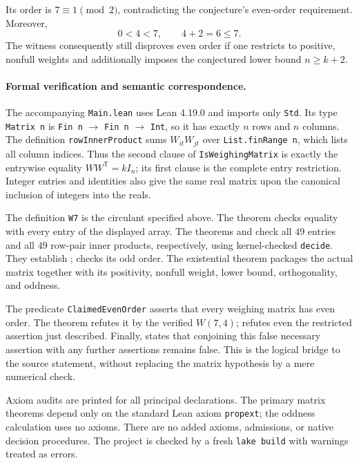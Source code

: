 \documentclass[10pt]{article}
\begin{document}
Its order is $7\equiv1\pmod2$, contradicting the conjecture's even-order requirement. Moreover,
\[
0<4<7,\qquad 4+2=6\le7.
\]
The witness consequently still disproves even order if one restricts to positive, nonfull weights and additionally imposes the conjectured lower bound $n\ge k+2$.

\newpage
\paragraph{Formal verification and semantic correspondence.}
The accompanying \texttt{Main.lean} uses Lean 4.19.0 and imports only \texttt{Std}. Its type \texttt{Matrix n} is \texttt{Fin n} $\to$ \texttt{Fin n} $\to$ \texttt{Int}, so it has exactly $n$ rows and $n$ columns. The definition \texttt{rowInnerProduct} sums $W_{it}W_{jt}$ over \texttt{List.finRange n}, which lists all column indices. Thus the second clause of \texttt{IsWeighingMatrix} is exactly the entrywise equality $WW^{\mathsf T}=kI_n$; its first clause is the complete entry restriction. Integer entries and identities also give the same real matrix upon the canonical inclusion of integers into the reals.

The definition \texttt{W7} is the circulant specified above. The theorem  checks equality with every entry of the displayed array. The theorems  and  check all $49$ entries and all $49$ row-pair inner products, respectively, using kernel-checked \texttt{decide}. They establish ;  checks its odd order. The existential theorem  packages the actual matrix together with its positivity, nonfull weight, lower bound, orthogonality, and oddness.

The predicate \texttt{ClaimedEvenOrder} asserts that every weighing matrix has even order. The theorem  refutes it by the verified $W(7,4)$;  refutes even the restricted assertion just described. Finally,  states that conjoining this false necessary assertion with any further assertions remains false. This is the logical bridge to the source statement, without replacing the matrix hypothesis by a mere numerical check.

Axiom audits are printed for all principal declarations. The primary matrix theorems depend only on the standard Lean axiom \texttt{propext}; the oddness calculation uses no axioms. There are no added axioms, admissions, or native decision procedures. The project is checked by a fresh \texttt{lake build} with warnings treated as errors.
\end{document}

